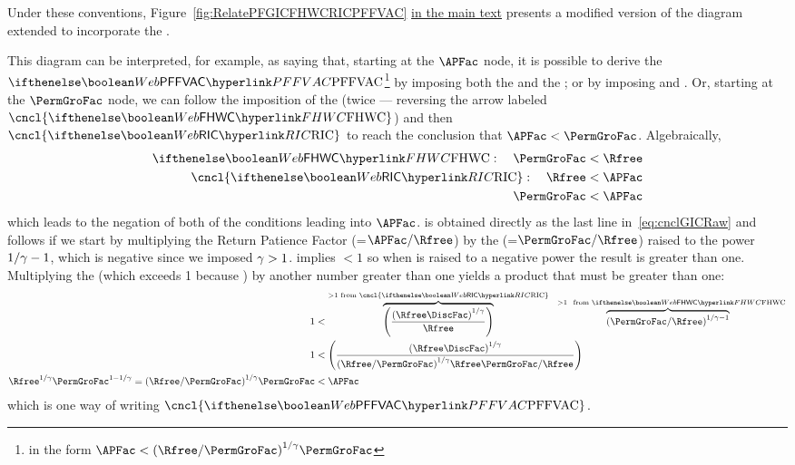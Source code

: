 \documentclass[\econtexRoot/BufferStockTheory]{subfiles}
\begin{document}
Under these conventions, Figure~\ref{fig:RelatePFGICFHWCRICPFFVAC} \hyperlink{RelatePFGICFHWCRICPFFVAC}{in the main text} presents a modified version of the diagram extended to incorporate the {\PFFVAC}.

  

This diagram can be interpreted, for example, as saying  that, starting at the $\APFac$ node, it is possible to derive the $\PFFVAC$\footnote{in the form $\APFac < {(\Rfree/\PermGroFac)}^{1/\CRRA}\PermGroFac$} by imposing both the {\GICRaw} and the {\FHWC}; or by imposing {\RIC} and \cncl{\FHWC}.
Or, starting at the $\PermGroFac$ node, we can follow the imposition of the {\FHWC} (twice --- reversing the arrow labeled $\cncl{\FHWC}$) and then $\cncl{\RIC}$ to reach the conclusion that $\APFac < \PermGroFac$.
Algebraically,
\begin{equation}\begin{gathered}\begin{aligned}
  {\FHWC}:~~~ \PermGroFac & < \Rfree 
  \\ \cncl{\RIC}:~~~ \Rfree & < \APFac 
  \\ \PermGroFac & < \APFac \label{eq:cnclGICRaw}
\end{aligned}\end{gathered}\end{equation}
which leads to the negation of both of the conditions leading into $\APFac$.
\cncl{\GICRaw} is obtained directly as the last line in~\eqref{eq:cnclGICRaw} and \cncl{\PFFVAC} follows if we start by multiplying the Return Patience Factor ({\RPFacDefn}=$\APFac/\Rfree$) by the {\FHWFacDefn} (=$\PermGroFac/\Rfree$) raised to the power $1/\gamma-1$, which is negative since we imposed $\gamma > 1$.
{\FHWC} implies {\FHWFacDefn} $< 1$ so when {\FHWFacDefn} is raised to a negative power the result is greater than one.
Multiplying the {\RPFacDefn} (which exceeds 1 because \cncl{\RIC}) by another number greater than one yields a product that must be greater than one:
\begin{equation}\begin{gathered}\begin{aligned}
  1  & < \overbrace{\left(\frac{{(\Rfree \DiscFac)}^{1/\CRRA}}{\Rfree}\right)}^{>1 \text{~from~}\cncl{\RIC}}\overbrace{{\left(\PermGroFac/\Rfree\right)}^{1/\CRRA-1}}^{\phantom{\ldots}>1~\text{~from~} \FHWC} \notag
  \\ 1  & < \left(\frac{{(\Rfree \DiscFac)}^{1/\CRRA}}{{(\Rfree/\PermGroFac)}^{1/\CRRA}\Rfree\PermGroFac/\Rfree}\right) \label{eq:cnclFHWFacDefnAndcnclRICImplycnclPFFVAC}
  \\ \Rfree^{1/\CRRA}\PermGroFac^{1 - 1/\CRRA} = {(\Rfree/\PermGroFac)}^{1/\CRRA} \PermGroFac  & < \APFac \notag
\end{aligned}\end{gathered}\end{equation}
which is one way of writing $\cncl{\PFFVAC}$.
\end{document}
